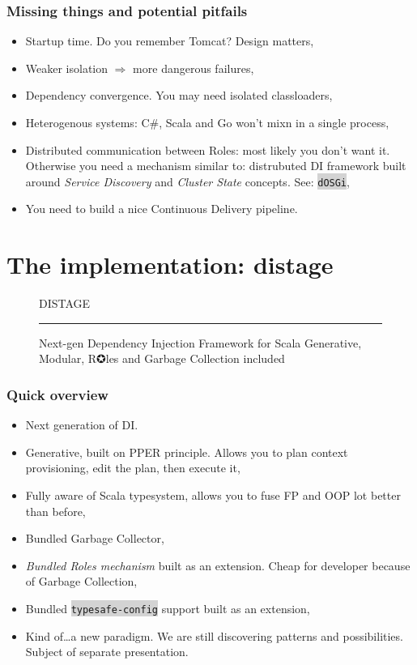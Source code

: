 \documentclass[usenames,dvipsnames]{beamer}
\newcommand{\code}[1]{\colorbox{lightgray}{\texttt{#1}}}
\begin{document}
\begin{frame}
\frametitle{Missing things and potential pitfails}
\begin{itemize}
\item Startup time. Do you remember Tomcat? Design matters\footnotemark[1],
\item Weaker isolation $\Rightarrow$ more dangerous failures,
\item Dependency convergence. You may need isolated classloaders\footnotemark[2],
\item Heterogenous systems: C\#, Scala and Go won't mixn in a single process\footnotemark[3], 
\item Distributed communication between Roles: most likely you don't want it. Otherwise 
      you need a mechanism similar to: distrubuted DI framework 
      built around \textit{Service Discovery} and \textit{Cluster State} concepts. See: \code{dOSGi},
\item You need to build a nice Continuous Delivery pipeline.
\end{itemize}
\end{frame}

\section{The implementation: distage}

\begin{frame}
\begin{figure}
\Huge 
\color{RubineRed} DISTAGE
\noindent
{\color{RubineRed} \rule{\linewidth}{1mm} }
\Large Next-gen Dependency Injection Framework for Scala
\normalsize Generative, Modular, R✪les and Garbage Collection included 
\end{figure}
\end{frame}

\begin{frame}
\frametitle{Quick overview}
\begin{itemize}
\item Next generation of DI.
\item Generative, built on PPER principle. Allows you to plan context provisioning, edit the plan, then execute it,
\item Fully aware of Scala typesystem, allows you to fuse FP and OOP lot better than before, 
\item Bundled Garbage Collector,
\item \textit{Bundled Roles mechanism} built as an extension. Cheap for developer because of Garbage Collection,
\item Bundled \code{typesafe-config} support built as an extension,
\item Kind of\dots a new paradigm. We are still discovering patterns and possibilities. Subject of separate presentation.
\end{itemize}
\end{frame}
\end{document}
